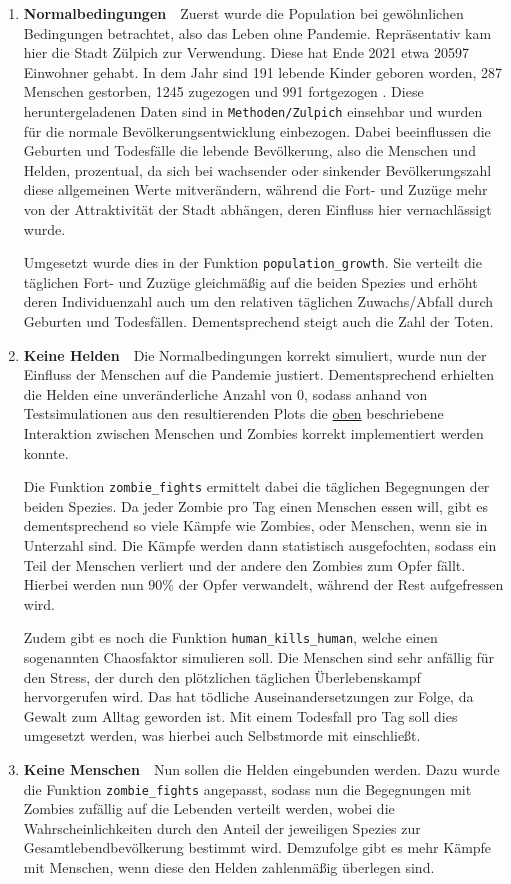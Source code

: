     \begin{enumerate}[1.]
        \item \textbf{Normalbedingungen}\ \ 
            Zuerst wurde die Population bei gewöhnlichen Bedingungen betrachtet, also das Leben ohne Pandemie. Repräsentativ kam hier die Stadt Zülpich zur Verwendung. Diese hat Ende 2021 etwa 20597 Einwohner gehabt. In dem Jahr sind 191 lebende Kinder geboren worden, 287 Menschen gestorben, 1245 zugezogen und 991 fortgezogen \cite{zulpich}. Diese heruntergeladenen Daten sind in \texttt{Methoden/Zulpich} einsehbar und wurden für die normale Bevölkerungsentwicklung einbezogen. Dabei beeinflussen die Geburten und Todesfälle die lebende Bevölkerung, also die Menschen und Helden, prozentual, da sich bei wachsender oder sinkender Bevölkerungszahl diese allgemeinen Werte mitverändern, während die Fort- und Zuzüge mehr von der Attraktivität der Stadt abhängen, deren Einfluss hier vernachlässigt wurde.

            Umgesetzt wurde dies in der Funktion \texttt{population\_growth}. Sie verteilt die täglichen Fort- und Zuzüge gleichmäßig auf die beiden Spezies und erhöht deren Individuenzahl auch um den relativen täglichen Zuwachs/Abfall durch Geburten und Todesfällen. Dementsprechend steigt auch die Zahl der Toten.
            \label{steps:normal}
        \item \textbf{Keine Helden}\ \ 
            Die Normalbedingungen korrekt simuliert, wurde nun der Einfluss der Menschen auf die Pandemie justiert. Dementsprechend erhielten die Helden eine unveränderliche Anzahl von 0, sodass anhand von Testsimulationen aus den resultierenden Plots die \hyperref[species]{oben} beschriebene Interaktion zwischen Menschen und Zombies korrekt implementiert werden konnte.

            Die Funktion \texttt{zombie\_fights} ermittelt dabei die täglichen Begegnungen der beiden Spezies. Da jeder Zombie pro Tag einen Menschen essen will, gibt es dementsprechend so viele Kämpfe wie Zombies, oder Menschen, wenn sie in Unterzahl sind. Die Kämpfe werden dann statistisch ausgefochten, sodass ein Teil der Menschen verliert und der andere den Zombies zum Opfer fällt. Hierbei werden nun 90\% der Opfer verwandelt, während der Rest aufgefressen wird.

            Zudem gibt es noch die Funktion \texttt{human\_kills\_human}, welche einen sogenannten Chaosfaktor simulieren soll. Die Menschen sind sehr anfällig für den Stress, der durch den plötzlichen täglichen Überlebenskampf hervorgerufen wird. Das hat tödliche Auseinandersetzungen zur Folge, da Gewalt zum Alltag geworden ist. Mit einem Todesfall pro Tag soll dies umgesetzt werden, was hierbei auch Selbstmorde mit einschließt.
            \label{steps:no_heroes}
        \item \textbf{Keine Menschen}\ \ 
            Nun sollen die Helden eingebunden werden. Dazu wurde die Funktion \texttt{zombie\_fights} angepasst, sodass nun die Begegnungen mit Zombies zufällig auf die Lebenden verteilt werden, wobei die Wahrscheinlichkeiten durch den Anteil der jeweiligen Spezies zur Gesamtlebendbevölkerung bestimmt wird. Demzufolge gibt es mehr Kämpfe mit Menschen, wenn diese den Helden zahlenmäßig überlegen sind.


\end{enumerate}
